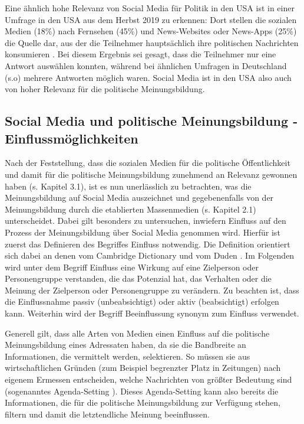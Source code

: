 Eine ähnlich hohe Relevanz von Social Media für Politik in den USA ist in einer Umfrage in den USA aus dem Herbst 2019 zu erkennen: Dort stellen die sozialen Medien (18\%) nach Fernsehen (45\%) und News-Websites oder News-Apps (25\%) die Quelle dar, aus der die Teilnehmer hauptsächlich ihre politischen Nachrichten konsumieren \autocite[vgl.][]{AmericansSourcesNews}.  Bei diesem Ergebnis sei gesagt, dass die Teilnehmer nur eine Antwort auswählen konnten, während bei ähnlichen Umfragen in Deutschland (s.o) mehrere Antworten möglich waren. Social Media ist in den USA also auch von hoher Relevanz für die politische Meinungsbildung.


\subsection{Social Media und politische Meinungsbildung - Einflussmöglichkeiten}
Nach der Feststellung, dass die sozialen Medien für die politische Öffentlichkeit und damit für die politische Meinungsbildung zunehmend an Relevanz gewonnen haben (s. Kapitel 3.1), ist es nun unerlässlich zu betrachten, was die Meinungsbildung auf Social Media auszeichnet und gegebenenfalls von der Meinungsbildung durch die etablierten Massenmedien (s. Kapitel 2.1) unterscheidet. Dabei gilt besonders zu untersuchen, inwiefern Einfluss auf den Prozess der Meinungsbildung über Social Media genommen wird. Hierfür ist zuerst das Definieren des Begriffes \glqq Einfluss\grqq{} notwendig. Die Definition orientiert sich dabei an denen vom Cambridge Dictionary und vom Duden \autocite[vgl.][]{einflussduden}\autocite[vgl.][]{influencecambridge}. Im Folgenden wird unter dem Begriff \glqq Einfluss\grqq{} eine Wirkung auf eine Zielperson oder Personengruppe verstanden, die das Potenzial hat, das Verhalten oder die Meinung der Zielperson oder Personengruppe zu verändern. Zu beachten ist, dass die Einflussnahme passiv (unbeabsichtigt) oder aktiv (beabsichtigt) erfolgen kann. Weiterhin wird der Begriff \glqq Beeinflussung\grqq{} synonym zum \glqq Einfluss\grqq{} verwendet.   

Generell gilt, dass alle Arten von Medien einen Einfluss auf die politische Meinungsbildung eines Adressaten haben, da sie die Bandbreite an Informationen, die vermittelt werden, selektieren. So müssen sie aus wirtschaftlichen Gründen (zum Beispiel begrenzter Platz in Zeitungen) nach eigenem Ermessen entscheiden, welche Nachrichten von größter Bedeutung sind (sogenanntes \glqq Agenda-Setting\grqq{} \autocite[vgl.][]{agendasetting}). Dieses Agenda-Setting kann also bereits die Informationen, die für die politische Meinungsbildung zur Verfügung stehen, filtern und damit die letztendliche Meinung beeinflussen. 

